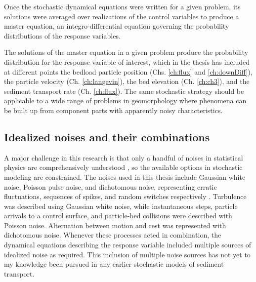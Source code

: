 Once the stochastic dynamical equations were written for a given problem, its solutions were averaged over realizations of the control variables to produce a master equation, an integro-differential equation governing the probability distributions of the response variables.

The solutions of the master equation in a given problem produce the probability distribution for the response variable of interest, which in the thesis has included at different points the bedload particle position (Chs. \ref{ch:flux} and \ref{ch:downDiff}), the particle velocity (Ch. \ref{ch:langevin}), the bed elevation (Ch. \ref{ch:ch3}), and the sediment transport rate (Ch. \ref{ch:flux}).
The same stochastic strategy should be applicable to a wide range of problems in geomorphology where phenomena can be built up from component parts with apparently noisy characteristics.


\subsection{Idealized noises and their combinations}

A major challenge in this research is that only a handful of noises in statistical physics are comprehensively understood \citep{Horsthemke1984}, so the available options in stochastic modeling are constrained.
The noises used in this thesis include Gaussian white noise, Poisson pulse noise, and dichotomous noise, representing erratic fluctuations, sequences of spikes, and random switches respectively \citep{VanDenBroeck1983}.
Turbulence was described using Gaussian white noise, while instantaneous steps, particle arrivals to a control surface, and particle-bed collisions were described with Poisson noise. Alternation between motion and rest was represented with dichotomous noise.
Whenever these processes acted in combination, the dynamical equations describing the response variable included multiple sources of idealized noise as required.
This inclusion of multiple noise sources has not yet to my knowledge been pursued in any earlier stochastic models of sediment transport.

